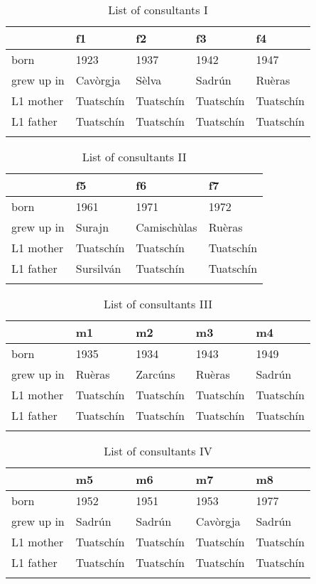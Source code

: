 \begin{table}
	\caption{List of consultants I}
	\label{tab:consultantsI}
	\begin{tabular}{lllll}
		\lsptoprule
		& f1 & f2 & f3 & f4\\
		\midrule
		born & 1923 & 1937 & 1942 & 1947\\
		grew up in & Cavòrgja & Sèlva & Sadrún & Ruèras \\
		L1 mother & Tuatschín & Tuatschín & Tuatschín & Tuatschín \\
		L1 father & Tuatschín & Tuatschín & Tuatschín & Tuatschín \\
		\lspbottomrule
	\end{tabular}
\end{table}

\begin{table}
	\caption{List of consultants II}
	\label{tab:consultantsII}
	\begin{tabular}{llll}
		\lsptoprule
		& f5 & f6 & f7 \\
		\midrule
		born &  1961 & 1971 & 1972 \\
		grew up in &  Surajn &  Camischùlas &  Ruèras  \\
		L1 mother & Tuatschín & Tuatschín & Tuatschín\\
		L1 father & Sursilván & Tuatschín & Tuatschín\\
		\lspbottomrule
	\end{tabular}
\end{table}

\begin{table}
	\caption{List of consultants III}
	\label{tab:consultantsIII}
	\begin{tabular}{lllll}
		\lsptoprule
		& m1 & m2 & m3 & m4\\
		\midrule
		born & 1935 & 1934 & 1943 & 1949 \\
		grew up in & Ruèras & Zarcúns & Ruèras & Sadrún\\
		L1 mother & Tuatschín & Tuatschín & Tuatschín & Tuatschín\\
		L1 father & Tuatschín & Tuatschín & Tuatschín & Tuatschín\\
		\lspbottomrule
	\end{tabular}
\end{table}

\begin{table}
	\caption{List of consultants IV}
	\label{tab:consultantsIV}
	\begin{tabular}{lllll}
		\lsptoprule
		& m5 & m6 & m7 & m8\\
		\midrule
		born & 1952 & 1951 & 1953 & 1977\\
		grew up in & Sadrún & Sadrún & Cavòrgja & Sadrún\\
		L1 mother & Tuatschín & Tuatschín & Tuatschín & Tuatschín \\
		L1 father & Tuatschín & Tuatschín  & Tuatschín & Tuatschín\\
		\lspbottomrule
	\end{tabular}
\end{table}

